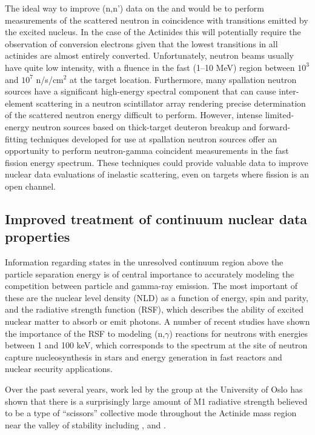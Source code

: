 \documentclass[letterpaper]{ar-1col}
\begin{document}
The ideal way to improve (n,n') data on the  and  would be to perform measurements of the scattered neutron in coincidence with transitions emitted by the excited nucleus.  In the case of the Actinides this will potentially require the observation of conversion electrons given that the lowest transitions in all actinides are almost entirely converted.  Unfortunately, neutron beams usually have quite low intensity, with a fluence in the fast (1--10 MeV) region between $10^3$ and $10^7$ n/s/cm$^2$ at the target location.  Furthermore, many spallation neutron sources have a significant high-energy spectral component that can cause inter-element scattering in a neutron scintillator array rendering precise determination of the scattered neutron energy difficult to  perform. However, intense limited-energy neutron sources based on thick-target deuteron breakup \cite{Harrig2018} and forward-fitting techniques developed for use at spallation neutron sources \cite{Kee18} offer an opportunity to perform neutron-gamma coincident measurements in the fast fission energy spectrum.  These techniques could provide valuable data to improve nuclear data evaluations of inelastic scattering, even on targets where fission is an open channel. 

\subsection{Improved treatment of continuum nuclear data properties}

Information regarding states in the unresolved continuum region above the particle separation energy is of central importance to accurately modeling the competition between particle and gamma-ray emission.  The most important of these are the nuclear level density (NLD) as a function of energy, spin and parity, and the radiative strength function (RSF), which describes the ability of excited nuclear matter to absorb or emit photons.  A number of recent studies have shown the importance of the RSF to modeling (n,$\gamma$) reactions for neutrons with energies between 1 and 100 keV, which corresponds to the spectrum at the site of neutron capture nucleosynthesis in stars \cite{PhysRevC.82.014318, Lar15} and energy generation in fast reactors and nuclear security applications.   

Over the past several years, work led by the group at the University of Oslo has shown that there is a surprisingly large amount of M1 radiative strength believed to be a type of \enquote{scissors} collective mode throughout the Actinide mass region near the valley of stability including ,  and  \cite{Lap16, Gut13, Gut13a, Gut14, Gut15}.
\end{document}
